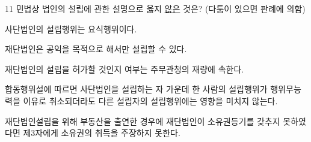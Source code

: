 \begin{question}{11}
민법상 법인의 설립에 관한 설명으로 옳지 \uline{않은} 것은? (다툼이 있으면 판례에 의함)
\begin{choices}
  \item 사단법인의 설립행위는 요식행위이다.
  \item 재단법인은 공익을 목적으로 해서만 설립할 수 있다.
  \item 재단법인의 설립을 허가할 것인지 여부는 주무관청의 재량에 속한다.
  \item 합동행위설에 따르면 사단법인을 설립하는 자 가운데 한 사람의 설립행위가 행위무능력을 이유로 취소되더라도 다른 설립자의 설립행위에는 영향을 미치지 않는다.
  \item 재단법인설립을 위해 부동산을 출연한 경우에 재단법인이 소유권등기를 갖추지 못하였다면 제3자에게 소유권의 취득을 주장하지 못한다.
\end{choices}
\end{question}
